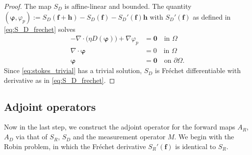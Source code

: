 \documentclass[final,leqno]{scrarticle}
\begin{document}
\begin{proof}
The map $S_D$ is affine-linear and bounded. The quantity $(\boldsymbol{\varphi},\varphi_p):=S_D(\mathbf{f}+\mathbf{h}) - S_D(\mathbf{f}) - S_D'(\mathbf{f})\mathbf{h}$ with $S_D'(\mathbf{f})$ as defined  in \eqref{eq:S_D_frechet} solves
 \begin{equation} 
 \begin{split} \label{eq:stokes_trivial}
  -\nabla \cdot \big( \eta D(\boldsymbol{\varphi}) \big) + \nabla \varphi_p &= \mathbf{0} \quad \text{in } \Omega\\
  \nabla \cdot \boldsymbol{\varphi} &= 0 \quad \text{in } \Omega \\
  \boldsymbol{\varphi} &= \mathbf{0} \quad \text{on } \partial\Omega.
 \end{split}
\end{equation}
Since \eqref{eq:stokes_trivial} has a trivial solution, $S_D$ is Fr\'echet differentiable with derivative as in \eqref{eq:S_D_frechet}. 
\end{proof}

\subsection{Adjoint operators\label{sec:adjoints}}
Now in the last step, we construct the adjoint operator for the forward maps $A_R$, $A_D$ via that of $S_R$, $S_D$ and the measurement operator $M$.
We begin with the Robin problem, in which the Fr\'echet derivative $S_R'(\mathbf{f})$ is identical to $S_R$. 
\end{document}
